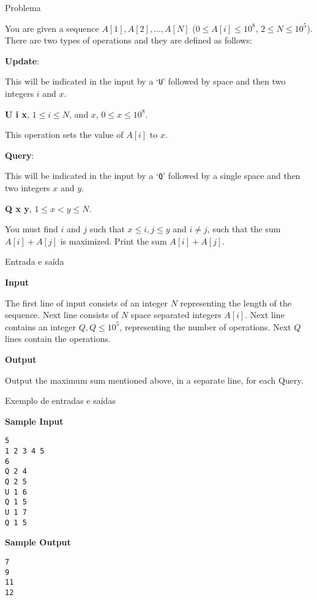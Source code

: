 
\begin{frame}[fragile]{Problema}

You are given a sequence $A[1], A[2], \ldots, A[N]$ ($0 \leq A[i] \leq 10^8$, $2 \leq N \leq 10^5$).
There are two types of operations and they are defined as follows:

\textbf{Update}:

This will be indicated in the input by a `\texttt{U}' followed by space and then two integers 
$i$ and $x$.

\textbf{U i x}, $1 \leq i \leq N$, and $x$, $0 \leq x \leq 10^8$.

This operation sets the value of $A[i]$ to $x$.

\textbf{Query}:

This will be indicated in the input by a `\texttt{Q}' followed by a single space and then two 
integers $x$ and $y$.

\textbf{Q x y}, $1 \leq x < y \leq N$.

You must find $i$ and $j$ such that $x \leq i, j \leq y$ and $i \neq j$, such that the sum 
$A[i]+A[j]$ is maximized. Print the sum $A[i]+A[j]$.

\end{frame}

\begin{frame}[fragile]{Entrada e saída}

\textbf{Input}

The first line of input consists of an integer $N$ representing the length of the sequence. Next 
line consists of $N$ space separated integers $A[i]$. Next line contains an integer 
$Q, Q \leq 10^5$, representing the number of operations. Next $Q$ lines contain the operations.

\vspace{0.2in}

\textbf{Output}

Output the maximum sum mentioned above, in a separate line, for each Query.

\end{frame}

\begin{frame}[fragile]{Exemplo de entradas e saídas}

\begin{minipage}[t]{0.5\textwidth}
\textbf{Sample Input}
\begin{verbatim}
5
1 2 3 4 5
6
Q 2 4
Q 2 5
U 1 6
Q 1 5
U 1 7
Q 1 5
\end{verbatim}
\end{minipage}
\begin{minipage}[t]{0.45\textwidth}
\textbf{Sample Output}
\begin{verbatim}
7
9
11
12
\end{verbatim}
\end{minipage}
\end{frame}

